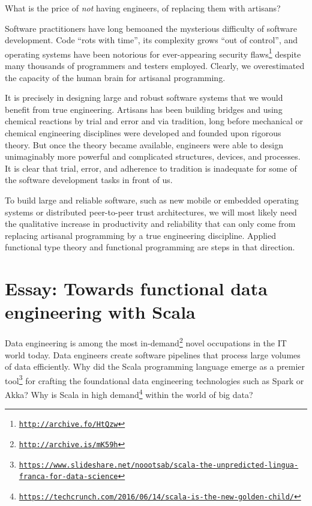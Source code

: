 What is the price of \emph{not} having engineers, of replacing them
with artisans?

Software practitioners have long bemoaned the mysterious difficulty
of software development. Code \textsf{``}rots with time\textsf{''}, its complexity
grows \textsf{``}out of control\textsf{''}, and operating systems have been notorious
for ever-appearing security flaws\footnote{\texttt{\href{http://archive.fo/HtQzw}{http://archive.fo/HtQzw}}}
despite many thousands of programmers and testers employed. Clearly,
we overestimated the capacity of the human brain for artisanal programming.

It is precisely in designing large and robust software systems that
we would benefit from true engineering. Artisans has been building
bridges and using chemical reactions by trial and error and via tradition,
long before mechanical or chemical engineering disciplines were developed
and founded upon rigorous theory. But once the theory became available,
engineers were able to design unimaginably more powerful and complicated
structures, devices, and processes. It is clear that trial, error,
and adherence to tradition is inadequate for some of the software
development tasks in front of us. 

To build large and reliable software, such as new mobile or embedded
operating systems or distributed peer-to-peer trust architectures,
we will most likely need the qualitative increase in productivity
and reliability that can only come from replacing artisanal programming
by a true engineering discipline. Applied functional type theory and
functional programming are steps in that direction.

\chapter{Essay: Towards functional data engineering with Scala}

Data engineering is among the most in-demand\footnote{\texttt{\href{http://archive.is/mK59h}{http://archive.is/mK59h}}}
novel occupations in the IT world today. Data engineers create software
pipelines that process large volumes of data efficiently. Why did
the Scala programming language emerge as a premier tool\footnote{\texttt{\href{https://www.slideshare.net/noootsab/scala-the-unpredicted-lingua-franca-for-data-science}{https://www.slideshare.net/noootsab/scala-the-unpredicted-lingua-franca-for-data-science}}}
for crafting the foundational data engineering technologies such as
Spark or Akka? Why is Scala in high demand\footnote{\texttt{\href{https://techcrunch.com/2016/06/14/scala-is-the-new-golden-child/}{https://techcrunch.com/2016/06/14/scala-is-the-new-golden-child/}}}
within the world of big data?

